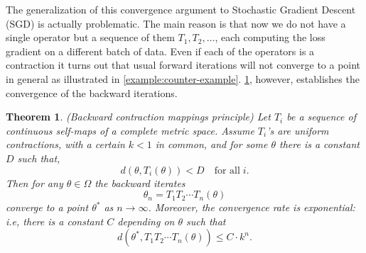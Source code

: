 \documentclass[10pt]{article} %
\theoremstyle{plain}
\newtheorem{theorem}{Theorem}[section]
\theoremstyle{definition}
\theoremstyle{remark}
\begin{document}
The generalization of this convergence argument to Stochastic Gradient Descent (SGD) is actually problematic. The main reason is that now we do not have a single operator but a sequence of them $T_1, T_2, \dots$, each computing the loss gradient on a different batch of data. Even if each of the operators is a contraction it turns out that usual forward iterations will not converge to a point in general as illustrated in \cref{example:counter-example}.
\cref{lemma:contraction_principle}, however,  establishes the convergence of the backward iterations.

\begin{theorem}\label{lemma:contraction_principle}
    (Backward contraction mappings principle) Let $T_{i}$ be a sequence of continuous self-maps of a complete metric space.
    Assume 
    $T_i$'s are uniform
    contractions, with a certain $k<1$ in common, and for some $\theta$ there is a constant $D$ such that,
    \begin{equation}\label{condition:boundedness}
        d(\theta,T_{i}(\theta))<D\quad \textrm{for all} \; i.
    \end{equation}
    Then for any $\theta \in \Omega$ the backward iterates 
    \[
    \theta_n = T_{1} T_{2}\cdots T_{n}(\theta)
    \]
    converge to a point $\theta^*$ as $n\rightarrow \infty$. Moreover, the convergence rate is exponential: i.e,  there is a constant $C$ depending on $\theta$ such that 
    \[
    d(\theta^*, T_{1} T_{2}\cdots T_{n}(\theta))\leq C\cdot k^{n}.
    \]
\end{theorem}
\end{document}
